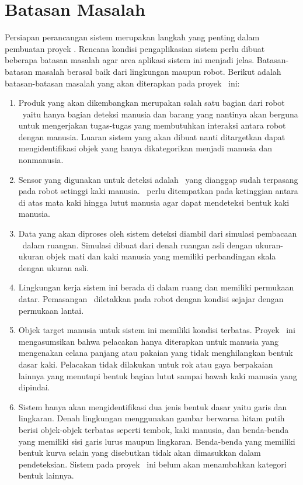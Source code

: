 \section{Batasan Masalah}
\label{sec:Batasan_Masalah}

Persiapan perancangan sistem merupakan langkah yang penting dalam pembuatan proyek \capstone. Rencana kondisi pengaplikasian sistem perlu dibuat beberapa batasan masalah agar area aplikasi sistem ini menjadi jelas. Batasan-batasan masalah berasal baik dari lingkungan maupun robot. Berikut adalah batasan-batasan masalah yang akan diterapkan pada proyek
\capstone\ ini:

\begin{enumerate}

    \item Produk yang akan dikembangkan merupakan salah satu bagian dari robot \covid\ yaitu hanya bagian deteksi manusia dan barang yang nantinya akan berguna untuk mengerjakan tugas-tugas yang membutuhkan interaksi antara robot dengan manusia. Luaran sistem yang akan dibuat nanti ditargetkan dapat mengidentifikasi objek yang hanya dikategorikan menjadi manusia dan nonmanusia.  
    \item Sensor yang digunakan untuk deteksi adalah \lidar\ yang dianggap sudah terpasang pada robot setinggi kaki manusia. \lidar\ perlu ditempatkan pada ketinggian antara di atas mata kaki hingga lutut manusia agar dapat mendeteksi bentuk kaki manusia.  
    \item Data yang akan diproses oleh sistem deteksi diambil dari simulasi pembacaan \lidar\ dalam ruangan. Simulasi dibuat dari denah ruangan asli dengan ukuran-ukuran objek mati dan kaki manusia yang memiliki perbandingan skala dengan ukuran asli.  
    \item Lingkungan kerja sistem ini berada di dalam ruang dan memiliki permukaan datar. Pemasangan \lidar\ diletakkan pada robot dengan kondisi sejajar dengan permukaan lantai.  
    \item Objek target manusia untuk sistem ini memiliki kondisi terbatas. Proyek \capstone\ ini mengasumsikan bahwa pelacakan hanya diterapkan untuk manusia yang mengenakan celana panjang atau pakaian yang tidak menghilangkan bentuk dasar kaki. Pelacakan tidak dilakukan untuk rok atau gaya berpakaian lainnya yang menutupi bentuk bagian lutut sampai bawah kaki manusia yang dipindai.  
    \item Sistem hanya akan mengidentifikasi dua jenis bentuk dasar yaitu garis dan lingkaran. Denah lingkungan menggunakan gambar berwarna hitam putih berisi objek-objek terbatas seperti tembok, kaki manusia, dan benda-benda yang memiliki sisi garis lurus maupun lingkaran. Benda-benda yang memiliki bentuk kurva selain yang disebutkan tidak akan dimasukkan dalam pendeteksian. Sistem pada proyek \capstone\ ini belum akan menambahkan kategori bentuk lainnya.  

\end{enumerate}
